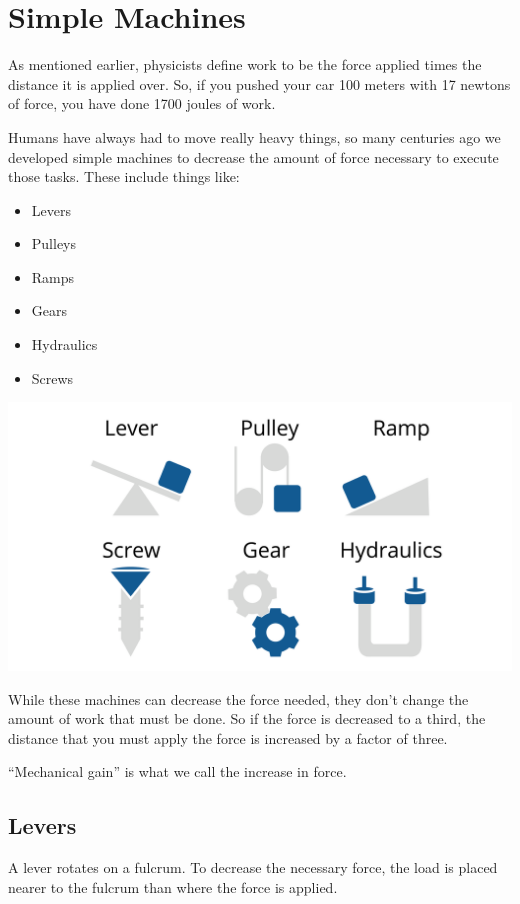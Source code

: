 \chapter{Simple Machines}

As mentioned earlier, physicists define work to be the force applied
times the distance it is applied over. So, if you pushed your car 100
meters with 17 newtons of force, you have done 1700 joules of work.

Humans have always had to move really heavy things, so many centuries
ago we developed simple machines to decrease the amount of force
necessary to execute those tasks. These include things like:
\begin{itemize}
\item Levers
\item Pulleys
\item Ramps
\item Gears
\item Hydraulics
\item Screws
\end{itemize}

\includegraphics[width=1\textwidth]{simplemachines.png}

While these machines can decrease the force needed, they don't change
the amount of work that must be done. So if the force is decreased to
a third, the distance that you must apply the force is increased by a
factor of three.

``Mechanical gain'' is what we call the increase in force.

\section{Levers}

A lever rotates on a fulcrum. To decrease the necessary force, the load
is placed nearer to the fulcrum than where the force is applied.

